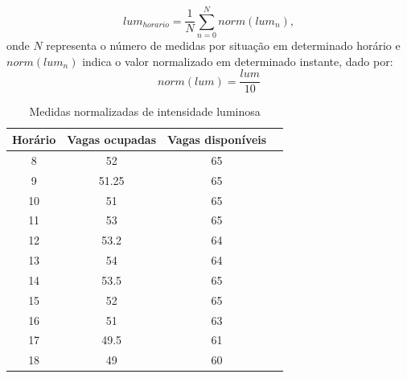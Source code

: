 \documentclass[oneside,openright,12pt]{ufsm_2015} %
\begin{document}
    \begin{equation}
        lum_{horario} = \frac{1}{N} \sum_{n=0}^{N} norm(lum_n),
        \label{eq:lum_horario}
    \end{equation}
    onde $N$ representa o número de medidas por situação em determinado horário e $norm(lum_n)$ indica o valor normalizado em determinado instante, dado por: \begin{equation}
        norm(lum) = \frac{lum}{10}
        \label{eq:norm_lum}
    \end{equation}
    
    \begin{table}[ht]
         \centering
         \caption{Medidas normalizadas de intensidade luminosa}
         \begin{tabular}{ c c c c }
             \hline
              Horário & Vagas ocupadas & Vagas disponíveis \\ 
             \hline
             8 & 52 & 65\\
             \hline
             9 & 51.25 & 65\\
             \hline
             10 & 51 & 65\\
             \hline
             11 & 53 & 65\\
             \hline
             12 & 53.2 & 64\\
             \hline
             13 & 54 & 64\\
             \hline
             14 & 53.5 & 65\\
             \hline
             15 & 52 & 65\\
             \hline
             16 & 51 & 63\\
             \hline
             17 & 49.5 & 61\\
             \hline
             18 & 49 & 60\\
             \hline
         \end{tabular}
         \vspace{\baselineskip} %
          \label{table:indices-ldr}
    \end{table}
    
\end{document}
